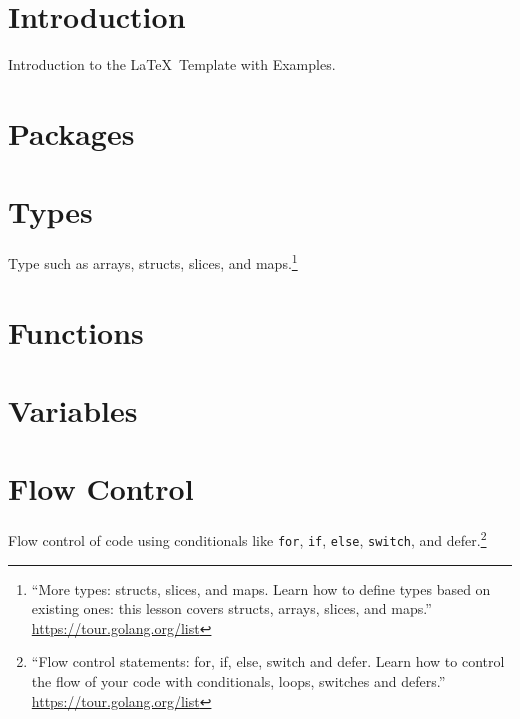\documentclass[12pt,letterpaper,dvips]{article}
\begin{document}
\newpage
\section{Introduction}
Introduction to the \LaTeX\ Template with Examples.



\newpage
\section{Packages}


\newpage
\section{Types}
Type such as arrays, structs, slices, and maps.\footnote{``More
types: structs, slices, and maps.  Learn how to define types
based on existing ones: this lesson covers structs, arrays, slices,
and maps.''\\
\href{https://tour.golang.org/list}{https://tour.golang.org/list}}


\newpage
\section{Functions}


\newpage
\section{Variables}

\newpage
\section{Flow Control}
Flow control of code using conditionals like \texttt{for},
\texttt{if}, \texttt{else}, \texttt{switch},
and defer.\footnote{``Flow control statements: for, if, else,
switch and defer.  Learn how to control the flow of your code
with conditionals, loops, switches and defers.''\\\href{https://tour.golang.org/list}{https://tour.golang.org/list}}
\end{document}
